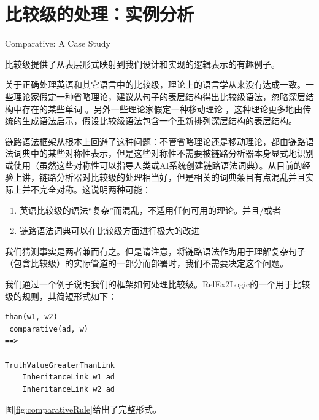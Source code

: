 \section{比较级的处理：实例分析}{Comparative: A Case Study}  

比较级提供了从表层形式映射到我们设计和实现的逻辑表示的有趣例子。

关于正确处理英语和其它语言中的比较级，理论上的语言学从来没有达成一致。一些理论家假定一种省略理论，建议从句子的表层结构得出比较级语法，忽略深层结构中存在的某些单词\cite{lechner2004ellipsis} \cite{Bhatt2011}。另外一些理论家假定一种移动理论\cite{Margaret2013} \cite{Roumyana1995}，这种理论更多地由传统的生成语法启示，假设比较级语法包含一个重新排列深层结构的表层结构。

链路语法框架从根本上回避了这种问题：不管省略理论还是移动理论，都由链路语法词典中的某些对称性表示，但是这些对称性不需要被链路分析器本身显式地识别或使用（虽然这些对称性可以指导人类或AI系统创建链路语法词典）。从目前的经验上讲，链路分析器对比较级的处理相当好，但是相关的词典条目有点混乱并且实际上并不完全对称。这说明两种可能：

\begin{enumerate}
\item 英语比较级的语法“复杂”而混乱，不适用任何可用的理论。并且/或者
\item 链路语法词典可以在比较级方面进行极大的改进
\end{enumerate}

我们猜测事实是两者兼而有之。但是请注意，将链路语法作为用于理解复杂句子（包含比较级）的实际管道的一部分而部署时，我们不需要决定这个问题。

我们通过一个例子说明我们的框架如何处理比较级。RelEx2Logic的一个用于比较级的规则，其简短形式如下：

 {\tt\begin{small}\begin{lstlisting}
than(w1, w2)
_comparative(ad, w)
==>

TruthValueGreaterThanLink
    InheritanceLink w1 ad
    InheritanceLink w2 ad
\end{lstlisting}\end{small}}

图\ref{fig:comparativeRule}给出了完整形式。

